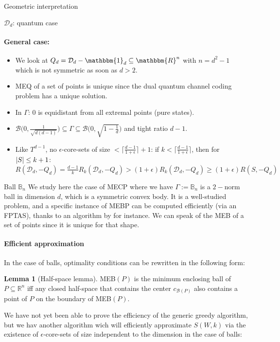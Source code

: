 \documentclass{article}
\theoremstyle{definition}
\newtheorem{lem}[theo]{Lemma}
\theoremstyle{remark}
\begin{document}
\begin{subsection}{Geometric interpretation}
\begin{subsubsection}{$\mathcal{D}_d$: quantum case}
    \paragraph{General case:}
      \begin{itemize}
      \item We look at $Q_d = \mathcal{D}_d-\mathbbm{1}_d \subseteq \mathbbm{R}^n$ with $n=d^2-1$ which is not symmetric as soon as $d>2$.
      \item MEQ of a set of points is unique since the dual quantum channel coding problem has a unique solution.
      \item In $\Gamma$: $0$ is equidistant from all extremal points (pure states).
      \item $\mathcal{B}\Big(0,\frac{1}{\sqrt{d(d-1)}}\Big) \subseteq \Gamma \subseteq \mathcal{B}\Big(0,\sqrt{1-\frac{1}{d}}\Big)$ and tight ratio $d-1$.
      \item Like $T^{d-1}$, no $\epsilon$-core-sets of size $< \lceil\frac{d-1}{1+\epsilon}\rceil + 1$:
      if $k < \lceil\frac{d-1}{1+\epsilon}\rceil$, then for $\abs{S} \leq k+1$: 
      $R(\mathcal{D}_d,-Q_d)=\frac{d-1}{k}R_k(\mathcal{D}_d,-Q_d) > (1+\epsilon)R_k(\mathcal{D}_d,-Q_d) \geq (1+\epsilon)R(S,-Q_d)$
      \end{itemize}
  \end{subsubsection}
  \begin{subsubsection}{Ball $\mathbb{B}_n$}
    \label{balls}
    We study here the case of MECP where we have $\Gamma := \mathbb{B}_n$ is a $2-$norm ball in dimension $d$, which is a symmetric convex body. It is a well-studied problem, and a specific instance of MEBP can be computed efficiently (via an FPTAS), thanks to an algorithm by \cite{BK03} for instance. We can speak of the MEB of a set of points since it is unique for that shape.

    \paragraph{Efficient approximation}
    In the case of balls, optimality conditions can be rewritten in the following form:
    \begin{lem}[Half-space lemma]
      MEB$(P)$ is the minimum enclosing ball of $P \subseteq \mathbb{R}^n$ iff any closed half-space that contains the center $c_{\mathcal{B}(P)}$ also contains a point of $P$ on the boundary of MEB$(P)$.
  \end{lem}
    We have not yet been able to prove the efficiency of the generic greedy algorithm, but we hav another algorithm wich will efficiently approximate $S(W,k)$ via the existence of $\epsilon$-core-sets of size independent to the dimension in the case of balls:


\end{subsubsection}
\end{subsection}
\end{document}
